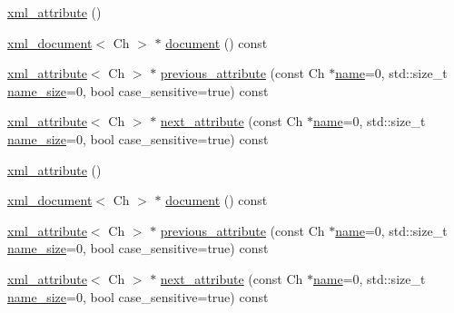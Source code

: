 \begin{DoxyCompactItemize}
\item 
\mbox{\hyperlink{classrapidxml_1_1xml__attribute_a26be291103917d3e8de110d46dd83816}{xml\+\_\+attribute}} ()
\item 
\mbox{\hyperlink{classrapidxml_1_1xml__document}{xml\+\_\+document}}$<$ Ch $>$ $\ast$ \mbox{\hyperlink{classrapidxml_1_1xml__attribute_ab0ff3bc7880a6969ddcf0bb1e0444077}{document}} () const
\item 
\mbox{\hyperlink{classrapidxml_1_1xml__attribute}{xml\+\_\+attribute}}$<$ Ch $>$ $\ast$ \mbox{\hyperlink{classrapidxml_1_1xml__attribute_abb0fb881f7247aefaec4b65b5eabc7ee}{previous\+\_\+attribute}} (const Ch $\ast$\mbox{\hyperlink{classrapidxml_1_1xml__base_aef8ae147fbee59209f714274afc80dc4}{name}}=0, std\+::size\+\_\+t \mbox{\hyperlink{classrapidxml_1_1xml__base_a20c8ffbe0c7a0b4231681ab8b99330a4}{name\+\_\+size}}=0, bool case\+\_\+sensitive=true) const
\item 
\mbox{\hyperlink{classrapidxml_1_1xml__attribute}{xml\+\_\+attribute}}$<$ Ch $>$ $\ast$ \mbox{\hyperlink{classrapidxml_1_1xml__attribute_affd0c8d0a9020df0998c507cae5474e5}{next\+\_\+attribute}} (const Ch $\ast$\mbox{\hyperlink{classrapidxml_1_1xml__base_aef8ae147fbee59209f714274afc80dc4}{name}}=0, std\+::size\+\_\+t \mbox{\hyperlink{classrapidxml_1_1xml__base_a20c8ffbe0c7a0b4231681ab8b99330a4}{name\+\_\+size}}=0, bool case\+\_\+sensitive=true) const
\item 
\mbox{\hyperlink{classrapidxml_1_1xml__attribute_a26be291103917d3e8de110d46dd83816}{xml\+\_\+attribute}} ()
\item 
\mbox{\hyperlink{classrapidxml_1_1xml__document}{xml\+\_\+document}}$<$ Ch $>$ $\ast$ \mbox{\hyperlink{classrapidxml_1_1xml__attribute_ab0ff3bc7880a6969ddcf0bb1e0444077}{document}} () const
\item 
\mbox{\hyperlink{classrapidxml_1_1xml__attribute}{xml\+\_\+attribute}}$<$ Ch $>$ $\ast$ \mbox{\hyperlink{classrapidxml_1_1xml__attribute_abb0fb881f7247aefaec4b65b5eabc7ee}{previous\+\_\+attribute}} (const Ch $\ast$\mbox{\hyperlink{classrapidxml_1_1xml__base_aef8ae147fbee59209f714274afc80dc4}{name}}=0, std\+::size\+\_\+t \mbox{\hyperlink{classrapidxml_1_1xml__base_a20c8ffbe0c7a0b4231681ab8b99330a4}{name\+\_\+size}}=0, bool case\+\_\+sensitive=true) const
\item 
\mbox{\hyperlink{classrapidxml_1_1xml__attribute}{xml\+\_\+attribute}}$<$ Ch $>$ $\ast$ \mbox{\hyperlink{classrapidxml_1_1xml__attribute_affd0c8d0a9020df0998c507cae5474e5}{next\+\_\+attribute}} (const Ch $\ast$\mbox{\hyperlink{classrapidxml_1_1xml__base_aef8ae147fbee59209f714274afc80dc4}{name}}=0, std\+::size\+\_\+t \mbox{\hyperlink{classrapidxml_1_1xml__base_a20c8ffbe0c7a0b4231681ab8b99330a4}{name\+\_\+size}}=0, bool case\+\_\+sensitive=true) const
\end{DoxyCompactItemize}
